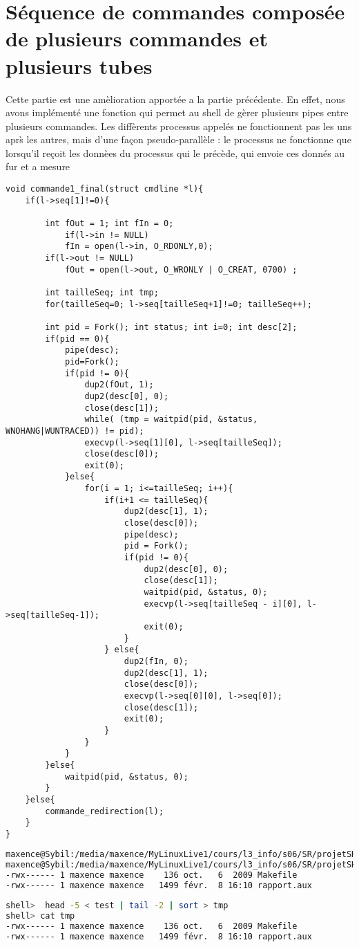\documentclass{report}
\begin{document}
		\section{S\'equence de commandes compos\'ee de plusieurs commandes et plusieurs tubes}
	Cette partie est une am\`elioration apport\'ee a la partie pr\'ec\'edente. En effet, nous avons impl\'ement\'e une fonction qui permet au shell de g\`erer plusieurs pipes entre plusieurs commandes. Les diff\`erents processus appel\'es ne fonctionnent pas les uns apr\`s les autres, mais d'une fa\c{c}on pseudo-parall\`ele : le processus ne fonctionne que lorsqu'il re\c{c}oit les donn\`ees du processus qui le pr\'ec\`ede, qui envoie ces donn\'es au fur et a mesure\\
			\begin{lstlisting}
void commande1_final(struct cmdline *l){
	if(l->seq[1]!=0){

		int fOut = 1; int fIn = 0;
			if(l->in != NULL)
			fIn = open(l->in, O_RDONLY,0);
		if(l->out != NULL)
			fOut = open(l->out, O_WRONLY | O_CREAT, 0700) ;

		int tailleSeq; int tmp;
		for(tailleSeq=0; l->seq[tailleSeq+1]!=0; tailleSeq++);

		int pid = Fork(); int status; int i=0; int desc[2];
		if(pid == 0){
			pipe(desc);
			pid=Fork();
			if(pid != 0){
				dup2(fOut, 1);
				dup2(desc[0], 0);
				close(desc[1]);
				while( (tmp = waitpid(pid, &status, WNOHANG|WUNTRACED)) != pid);
				execvp(l->seq[1][0], l->seq[tailleSeq]);
				close(desc[0]);
				exit(0);
			}else{
				for(i = 1; i<=tailleSeq; i++){
					if(i+1 <= tailleSeq){
						dup2(desc[1], 1);
						close(desc[0]);
						pipe(desc);
						pid = Fork();
						if(pid != 0){
							dup2(desc[0], 0);
							close(desc[1]);
							waitpid(pid, &status, 0);
							execvp(l->seq[tailleSeq - i][0], l->seq[tailleSeq-1]);
							exit(0);
						}
					} else{
						dup2(fIn, 0);
						dup2(desc[1], 1);
						close(desc[0]);
						execvp(l->seq[0][0], l->seq[0]);
						close(desc[1]);
						exit(0);
					}
				}		
			}
		}else{
			waitpid(pid, &status, 0);
		}
	}else{
		commande_redirection(l);
	}
}
			\end{lstlisting}
			\begin{lstlisting}[frame=single,basicstyle=\footnotesize,language=bash]
maxence@Sybil:/media/maxence/MyLinuxLive1/cours/l3_info/s06/SR/projetSHELL$ head -5 < test | tail -2 | sort > tmp2
maxence@Sybil:/media/maxence/MyLinuxLive1/cours/l3_info/s06/SR/projetSHELL$ cat tmp2
-rwx------ 1 maxence maxence    136 oct.   6  2009 Makefile
-rwx------ 1 maxence maxence   1499 févr.  8 16:10 rapport.aux
			\end{lstlisting}
			\begin{lstlisting}[frame=single,basicstyle=\footnotesize,language=bash]
shell>  head -5 < test | tail -2 | sort > tmp
shell> cat tmp
-rwx------ 1 maxence maxence    136 oct.   6  2009 Makefile
-rwx------ 1 maxence maxence   1499 févr.  8 16:10 rapport.aux
			\end{lstlisting}
\end{document}
